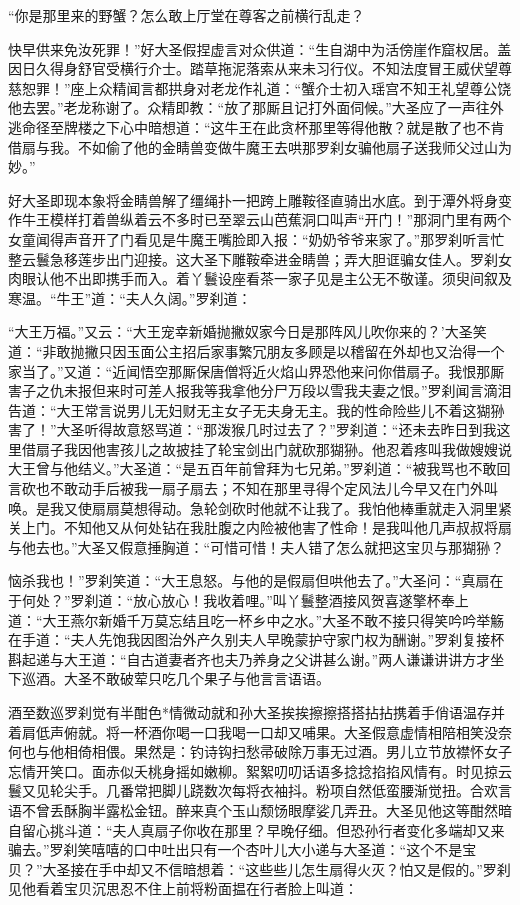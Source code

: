 \documentclass[12pt,UTF8]{ctexbook}
\begin{document}
“你是那里来的野蟹？怎么敢上厅堂在尊客之前横行乱走？

快早供来免汝死罪！”好大圣假捏虚言对众供道：“生自湖中为活傍崖作窟权居。盖因日久得身舒官受横行介士。踏草拖泥落索从来未习行仪。不知法度冒王威伏望尊慈恕罪！”座上众精闻言都拱身对老龙作礼道：“蟹介士初入瑶宫不知王礼望尊公饶他去罢。”老龙称谢了。众精即教：“放了那厮且记打外面伺候。”大圣应了一声往外逃命径至牌楼之下心中暗想道：“这牛王在此贪杯那里等得他散？就是散了也不肯借扇与我。不如偷了他的金睛兽变做牛魔王去哄那罗刹女骗他扇子送我师父过山为妙。”

好大圣即现本象将金睛兽解了缰绳扑一把跨上雕鞍径直骑出水底。到于潭外将身变作牛王模样打着兽纵着云不多时已至翠云山芭蕉洞口叫声“开门！”那洞门里有两个女童闻得声音开了门看见是牛魔王嘴脸即入报：“奶奶爷爷来家了。”那罗刹听言忙整云鬟急移莲步出门迎接。这大圣下雕鞍牵进金睛兽；弄大胆诓骗女佳人。罗刹女肉眼认他不出即携手而入。着丫鬟设座看茶一家子见是主公无不敬谨。须臾间叙及寒温。“牛王”道：“夫人久阔。”罗刹道：

“大王万福。”又云：“大王宠幸新婚抛撇奴家今日是那阵风儿吹你来的？’大圣笑道：“非敢抛撇只因玉面公主招后家事繁冗朋友多顾是以稽留在外却也又治得一个家当了。”又道：“近闻悟空那厮保唐僧将近火焰山界恐他来问你借扇子。我恨那厮害子之仇未报但来时可差人报我等我拿他分尸万段以雪我夫妻之恨。”罗刹闻言滴泪告道：“大王常言说男儿无妇财无主女子无夫身无主。我的性命险些儿不着这猢狲害了！”大圣听得故意怒骂道：“那泼猴几时过去了？”罗刹道：“还未去昨日到我这里借扇子我因他害孩儿之故披挂了轮宝剑出门就砍那猢狲。他忍着疼叫我做嫂嫂说大王曾与他结义。”大圣道：“是五百年前曾拜为七兄弟。”罗刹道：“被我骂也不敢回言砍也不敢动手后被我一扇子扇去；不知在那里寻得个定风法儿今早又在门外叫唤。是我又使扇扇莫想得动。急轮剑砍时他就不让我了。我怕他棒重就走入洞里紧关上门。不知他又从何处钻在我肚腹之内险被他害了性命！是我叫他几声叔叔将扇与他去也。”大圣又假意捶胸道：“可惜可惜！夫人错了怎么就把这宝贝与那猢狲？

恼杀我也！”罗刹笑道：“大王息怒。与他的是假扇但哄他去了。”大圣问：“真扇在于何处？”罗刹道：“放心放心！我收着哩。”叫丫鬟整酒接风贺喜遂擎杯奉上道：“大王燕尔新婚千万莫忘结且吃一杯乡中之水。”大圣不敢不接只得笑吟吟举觞在手道：“夫人先饱我因图治外产久别夫人早晚蒙护守家门权为酬谢。”罗刹复接杯斟起递与大王道：“自古道妻者齐也夫乃养身之父讲甚么谢。”两人谦谦讲讲方才坐下巡酒。大圣不敢破荤只吃几个果子与他言言语语。

酒至数巡罗刹觉有半酣色*情微动就和孙大圣挨挨擦擦搭搭拈拈携着手俏语温存并着肩低声俯就。将一杯酒你喝一口我喝一口却又哺果。大圣假意虚情相陪相笑没奈何也与他相倚相偎。果然是：钓诗钩扫愁帚破除万事无过酒。男儿立节放襟怀女子忘情开笑口。面赤似夭桃身摇如嫩柳。絮絮叨叨话语多捻捻掐掐风情有。时见掠云鬟又见轮尖手。几番常把脚儿跷数次每将衣袖抖。粉项自然低蛮腰渐觉扭。合欢言语不曾丢酥胸半露松金钮。醉来真个玉山颓饧眼摩娑几弄丑。大圣见他这等酣然暗自留心挑斗道：“夫人真扇子你收在那里？早晚仔细。但恐孙行者变化多端却又来骗去。”罗刹笑嘻嘻的口中吐出只有一个杏叶儿大小递与大圣道：“这个不是宝贝？”大圣接在手中却又不信暗想着：“这些些儿怎生扇得火灭？怕又是假的。”罗刹见他看着宝贝沉思忍不住上前将粉面揾在行者脸上叫道：
\end{document}
